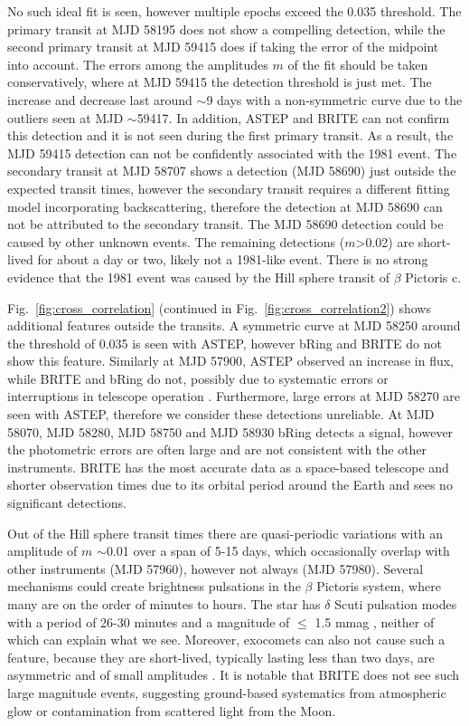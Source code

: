 \documentclass{aa}
\newcommand\picc{$\beta$ Pictoris c}
\newcommand\pic{$\beta$ Pictoris}
\begin{document}
	No such ideal fit is seen, however multiple epochs exceed the 0.035 threshold.
	The primary transit at MJD 58195 does not show a compelling detection, while the second primary transit at MJD 59415 does if taking the error of the midpoint into account. 
	The errors among the amplitudes $m$ of the fit should be taken conservatively, where at MJD 59415 the detection threshold is just met.
	The increase and decrease last around $\sim$9 days with a non-symmetric curve due to the outliers seen at MJD $\sim$59417. 
	In addition, ASTEP and BRITE can not confirm this detection and it is not seen during the first primary transit. 
	As a result, the MJD 59415 detection can not be confidently associated with the 1981 event.
	The secondary transit at MJD 58707 shows a detection (MJD 58690) just outside the expected transit times, however the secondary transit requires a different fitting model incorporating backscattering, therefore the detection at MJD 58690 can not be attributed to the secondary transit. 
	The MJD 58690 detection could be caused by other unknown events.
	The remaining detections ($m$>0.02) are short-lived for about a day or two, likely not a 1981-like event.
	There is no strong evidence that the 1981 event was caused by the Hill sphere transit of \picc{}.  
	
	Fig.~\ref{fig:cross_correlation} (continued in Fig.~\ref{fig:cross_correlation2}) shows additional features outside the transits. 
	A symmetric curve at MJD 58250 around the threshold of 0.035 is seen with ASTEP, however bRing and BRITE do not show this feature. 
	Similarly at MJD 57900, ASTEP observed an increase in flux, while BRITE and bRing do not, possibly due to systematic errors or interruptions in telescope operation \citep{Kenworthy_2021}.
	Furthermore, large errors at MJD 58270 are seen with ASTEP, therefore we consider these detections unreliable. 
	At MJD 58070, MJD 58280, MJD 58750 and MJD 58930 bRing detects a signal, however the photometric errors are often large and are not consistent with the other instruments. 
	BRITE has the most accurate data as a space-based telescope and shorter observation times due to its orbital period around the Earth and sees no significant detections.
	
	Out of the Hill sphere transit times there are quasi-periodic variations with an amplitude of $m$ $\sim$0.01 over a span of 5-15 days, which occasionally overlap with other instruments (MJD 57960), however not always (MJD 57980).
	Several mechanisms could create brightness pulsations in the \pic{} system, where many are on the order of minutes to hours.
	The star has $\delta$ Scuti pulsation modes with a period of 26-30 minutes and a magnitude of $\leq$ 1.5 mmag \citep{Koen_2003}, neither of which can explain what we see.
	Moreover, exocomets can also not cause such a feature, because they are short-lived, typically lasting less than two days, are asymmetric and of small amplitudes \citep[$<$2 mmag;][]{Heller_2024, Zieba_2019,  Pavlenko_2022, Lecavelier_2022}.  
	It is notable that BRITE does not see such large magnitude events, suggesting ground-based systematics from atmospheric glow or contamination from scattered light from the Moon. 
	
\end{document}
